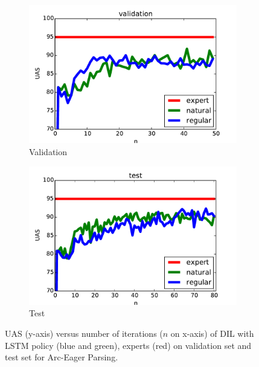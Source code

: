 \documentclass{article}
\begin{document}
\begin{figure}[t!]
	\centering
	\vspace{-2mm}
	\begin{subfigure}[l]{0.238\textwidth}
        \includegraphics[width=1.11\textwidth,keepaspectratio]{./figure/eager_validation_comparison.pdf}
        \caption{Validation}
        \label{fig:cartpole}
    \end{subfigure}
	\begin{subfigure}[l]{0.238\textwidth}
        \includegraphics[width=1.11\textwidth,keepaspectratio]{./figure/eager_test_comparison_2.pdf}
        \caption{Test}
        \label{fig:acrobot}
    \end{subfigure}
    \caption{UAS (y-axis) versus number of iterations ($n$ on x-axis) of DIL with LSTM policy (blue and green), experts (red) on validation set and test set for Arc-Eager Parsing. }
    \label{fig:perf_eager}
\end{figure}
\end{document}
